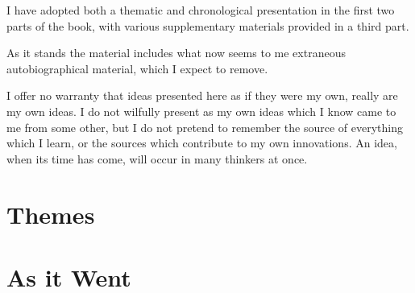 \documentclass[10pt,titlepage]{book}
\begin{document}
I have adopted both a thematic and chronological presentation in the first two parts of the book, with various supplementary materials provided in a third part.

As it stands the material includes what now seems to me extraneous autobiographical material, which I expect to remove.

I offer no warranty that ideas presented here as if they were my own, really are my own ideas.
I do not wilfully present as my own ideas which I know came to me from some other, but I do not pretend to remember the source of everything which I learn, or the sources which contribute to my own innovations.
An idea, when its time has come, will occur in many thinkers at once.

\part{Themes}



\part{As it Went}



\appendix





\backmatter




\label{index}
\twocolumn[]
{\small\printindex}
\end{document}
